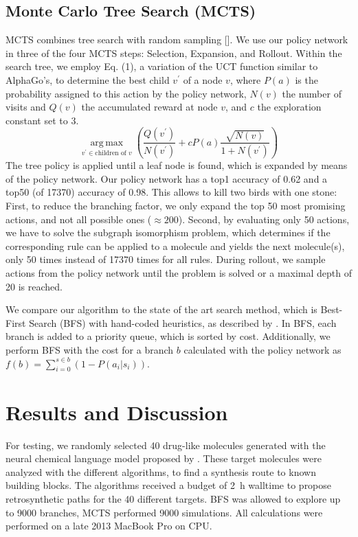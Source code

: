 \documentclass{article} %
\DeclareMathOperator{\argmax}{arg\,max}
\begin{document}
\subsection{Monte Carlo Tree Search (MCTS)}
MCTS combines tree search with random sampling [\cite{browne2012survey}]. We use our policy network in three of the four MCTS steps: Selection, Expansion, and Rollout.
Within the search tree, we employ Eq. (1), a variation of the UCT function similar to AlphaGo's, to determine the best child $v^\prime$ of a node $v$, where $P(a)$ is the probability assigned to this action by the policy network, $N(v)$ the number of visits and $Q(v)$ the accumulated reward at node $v$, and $c$ the exploration constant set to 3. 
\begin{equation}
\underset{v^\prime \in \text{children of } v}{\argmax}\left(\frac{Q(v^\prime)}{N(v^\prime)} + c P(a) \frac{\sqrt{N(v)}}{1+N(v^\prime)}\right)
\end{equation} %
The tree policy is applied until a leaf node is found,  which is expanded by means of the policy network. %
Our policy network has a top1 accuracy of 0.62 and a top50 (of 17370) accuracy of 0.98. This allows to kill two birds with one stone: First, to reduce the branching factor, we only expand the top 50 most promising actions, and not all possible ones ($\approx 200$). 
Second, by evaluating only 50 actions, we have to solve the subgraph isomorphism problem, which determines if the corresponding rule can  be applied to a molecule and yields the next molecule(s), only 50 times instead of 17370 times for all rules. During rollout, we sample actions from the policy network until the problem is solved or a maximal depth of 20 is reached.

We compare our algorithm to the state of the art search method, which is Best-First Search (BFS) with hand-coded heuristics, as described by \cite{szymkuc2016computer}. In BFS, each branch is added to a priority queue, which is sorted by cost. Additionally, we perform BFS with the cost for a branch $b$ calculated with the policy network as $f(b) = \sum_{i=0}^{s \in b}(1-P(a_i|s_i))$.


\section{Results and Discussion}
For testing, we randomly selected 40 drug-like molecules generated with the neural chemical language model proposed  by \cite{segler2017generating}. These target molecules were analyzed with the different algorithms, to find a synthesis route to known building blocks. The algorithms received a budget of 2~h walltime to propose retrosynthetic paths for the 40 different targets. BFS was allowed to explore up to 9000 branches, MCTS performed 9000 simulations. All calculations were performed on a late 2013 MacBook Pro on CPU. 
\end{document}
